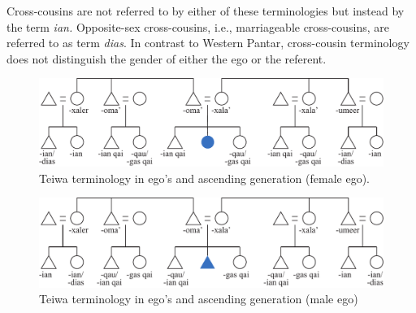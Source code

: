 Cross-cousins are not referred to by either of these terminologies but instead by the term \textit{ian.} Opposite-sex cross-cousins, i.e., marriageable cross-cousins, are referred to as term \textit{dias}. In contrast to Western Pantar, cross-cousin terminology does not distinguish the gender of either the ego or the referent.

\begin{figure}
\includegraphics[width=\textwidth]{figures/Holton_ch5_fig5.pdf}
\caption{Teiwa terminology in ego's and ascending generation (female ego). }
\label{fig:5:5}
\end{figure}   

\begin{figure}
\includegraphics[width=\textwidth]{figures/Holton_ch5_fig6.pdf}
\caption{Teiwa terminology in ego's and ascending generation (male ego) }
\label{fig:5:6}
\end{figure}  
 

